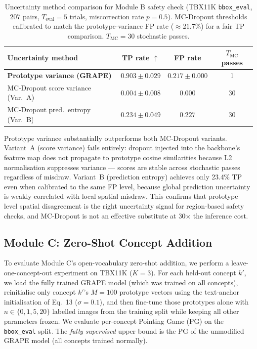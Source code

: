 \documentclass{article}
\begin{document}
\begin{table}[t]
  \caption{Uncertainty method comparison for Module B safety check (TBX11K \texttt{bbox\_eval}, 207 pairs, $T_\text{eval}=5$ trials, miscorrection rate $p=0.5$). MC-Dropout thresholds calibrated to match the prototype-variance FP rate ($\approx21.7\%$) for a fair TP comparison. $T_\text{MC}=30$ stochastic passes.}
  \label{tab:n5}
  \centering
  \begin{tabular}{lccc}
    \toprule
    Uncertainty method & TP rate $\uparrow$ & FP rate & $T_\text{MC}$ passes \\
    \midrule
    \textbf{Prototype variance (GRAPE)}       & $\mathbf{0.903 \pm 0.029}$ & $0.217 \pm 0.000$ & 1 \\
    MC-Dropout score variance (Var.~A)        & $0.004 \pm 0.008$          & $0.000$           & 30 \\
    MC-Dropout pred.\ entropy (Var.~B)        & $0.234 \pm 0.049$          & $0.227$           & 30 \\
    \bottomrule
  \end{tabular}
\end{table}

Prototype variance substantially outperforms both MC-Dropout variants.
Variant~A (score variance) fails entirely: dropout injected into the backbone's feature map does not propagate to prototype cosine similarities because L2 normalisation suppresses variance — scores are stable across stochastic passes regardless of misdraw.
Variant~B (prediction entropy) achieves only 23.4\% TP even when calibrated to the same FP level, because global prediction uncertainty is weakly correlated with local spatial misdraw.
This confirms that prototype-level spatial disagreement is the right uncertainty signal for region-based safety checks, and MC-Dropout is not an effective substitute at 30$\times$ the inference cost.

\subsection{Module C: Zero-Shot Concept Addition}
\label{sec:zeroshot_eval}

To evaluate Module C's open-vocabulary zero-shot addition, we perform a leave-one-concept-out experiment on TBX11K ($K=3$).
For each held-out concept $k'$, we load the fully trained GRAPE model (which was trained on all concepts), reinitialise only concept $k'$'s $M=100$ prototype vectors using the text-anchor initialisation of Eq.~13 ($\sigma=0.1$), and then fine-tune those prototypes alone with $n \in \{0, 1, 5, 20\}$ labelled images from the training split while keeping all other parameters frozen.
We evaluate per-concept Pointing Game (PG) on the \texttt{bbox\_eval} split.
The \emph{fully supervised} upper bound is the PG of the unmodified GRAPE model (all concepts trained normally).
\end{document}
